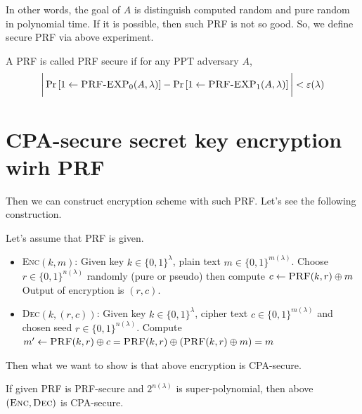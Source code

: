 \documentclass[12pt, a4paper, openany, twoside]{book}
\theoremstyle{definition}
\theoremstyle{remark}
\theoremstyle{plain}
\numberwithin{equation}{section}
\begin{document}
In other words, the goal of $A$ is distinguish computed random and pure random in polynomial time. If 
it is possible, then such \textsc{PRF} is not so good. So, we define secure \textsc{PRF} via above experiment. 

\begin{tcolorbox}[colback=yellow!10!white,colframe=brown!75!black,title=PRF secure]

A \textsc{PRF} is called PRF secure if for any PPT adversary $A$, 
\[\bigg| \Pr\left[1 \gets \textsc{PRF-EXP}_0(A, \lambda)\right] - \Pr\left[1 \gets \textsc{PRF-EXP}_1(A, \lambda)\right] \bigg| < \varepsilon(\lambda)\]

\end{tcolorbox}

\newpage 

\section{CPA-secure secret key encryption wirh PRF}

Then we can construct encryption scheme with such PRF. Let's see the following construction. 

\begin{tcolorbox}[colback=yellow!10!white,colframe=blue!75!white,title=Encryption with PRF]

Let's assume that \textsc{PRF} is given.
\begin{itemize} 
\item \textsc{Enc}$(k, m)$: Given key $k \in \{0,1\}^\lambda$, plain text $m \in \{0,1\}^{m(\lambda)}$. 
Choose $r \in \{0,1\}^{n(\lambda)}$ randomly (pure or pseudo) then compute $c \gets \textsc{PRF}(k,r) \oplus m$
Output of encryption is $(r, c)$. 
\item \textsc{Dec}$(k, (r,c))$: Given key $k \in \{0,1\}^{\lambda}$, cipher text $c \in \{0,1\}^{m(\lambda)}$ and chosen seed $r \in \{0,1\}^{n(\lambda)}$.
Compute $m' \gets \textsc{PRF}(k, r) \oplus c = \textsc{PRF}(k,r) \oplus (\textsc{PRF}(k, r) \oplus m) = m$ 
\end{itemize}
\end{tcolorbox}

Then what we want to show is that above encryption is CPA-secure. 

\begin{tcolorbox}[colback=yellow!10!white,colframe=brown!75!black,title=Encryption with PRF is CPA-secure]

If given \textsc{PRF} is \textsc{PRF}-secure and $2^{n(\lambda)}$ is super-polynomial, 
then above $(\textsc{Enc}, \textsc{Dec})$ is CPA-secure. 

\end{tcolorbox}
\end{document}
